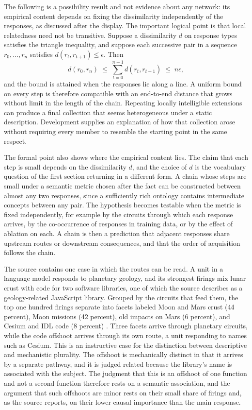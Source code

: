 \documentclass[11pt]{article}
\begin{document}
The following is a possibility result and not evidence about any network: its empirical content depends on fixing the dissimilarity independently of the responses, as discussed after the display. The important logical point is that local relatedness need not be transitive. Suppose a dissimilarity $d$ on response types satisfies the triangle inequality, and suppose each successive pair in a sequence $r_0,\dots,r_n$ satisfies $d(r_t,r_{t+1})\le\epsilon$. Then
\[
 d(r_0,r_n)\;\le\;\sum_{t=0}^{n-1} d(r_t,r_{t+1})\;\le\;n\epsilon ,
\]
and the bound is attained when the responses lie along a line. A uniform bound on every step is therefore compatible with an end-to-end distance that grows without limit in the length of the chain. Repeating locally intelligible extensions can produce a final collection that seems heterogeneous under a static description. Development supplies an explanation of how that collection arose without requiring every member to resemble the starting point in the same respect.

The formal point also shows where the empirical content lies. The claim that each step is small depends on the dissimilarity $d$, and the choice of $d$ is the vocabulary question of the first section returning in a different form. A chain whose steps are small under a semantic metric chosen after the fact can be constructed between almost any two responses, since a sufficiently rich ontology contains intermediate concepts between any pair. The hypothesis becomes testable when the metric is fixed independently, for example by the circuits through which each response arrives, by the co-occurrence of responses in training data, or by the effect of ablation on each. A chain is then a prediction that adjacent responses share upstream routes or downstream consequences, and that the order of acquisition follows the chain.

The source contains one case in which the routes can be read. A unit in a language model responds to planetary geology, and its strongest firings mix lunar crust with code for two software libraries, one of which the source describes as a geology-related JavaScript library. Grouped by the circuits that feed them, the top one hundred firings separate into facets labeled Moon and Mars crust (44 percent), Moon missions (42 percent), old impacts on Mars (6 percent), and Cesium and IDL code (8 percent) \cite[\emph{Recursive Generalization}]{cammarata}. Three facets arrive through planetary circuits, while the code offshoot arrives through its own route, a unit responding to names such as Cesium. This is an instructive case for the distinction between descriptive and mechanistic plurality. The offshoot is mechanically distinct in that it arrives by a separate pathway, and it is judged related because the library's name is associated with the subject. The judgment that this is an offshoot of one function and not a second function therefore rests on a semantic association, and the argument that such offshoots are minor rests on their small share of firings and, as the source reports, on their lower causal importance than the main response.
\end{document}
